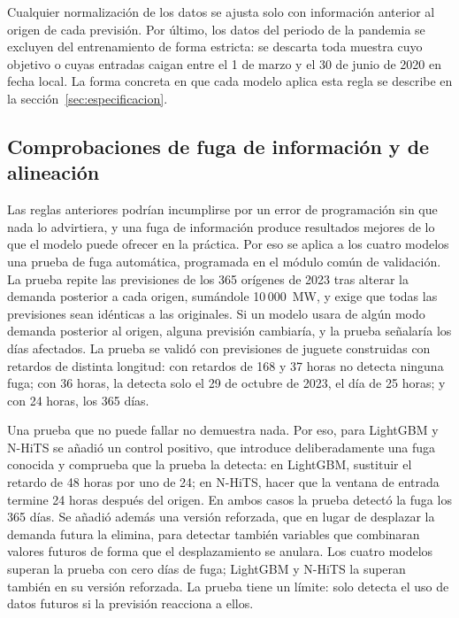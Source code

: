 Cualquier normalización de los datos se ajusta solo con información
anterior al origen de cada previsión. Por último, los datos del periodo de
la pandemia se excluyen del entrenamiento de forma estricta: se descarta
toda muestra cuyo objetivo o cuyas entradas caigan entre el 1 de marzo y el
30 de junio de 2020 en fecha local. La forma concreta en que cada modelo
aplica esta regla se describe en la sección~\ref{sec:especificacion}.

\subsection{Comprobaciones de fuga de información y de alineación}\label{sec:prot-fuga}

Las reglas anteriores podrían incumplirse por un error de programación sin
que nada lo advirtiera, y una fuga de información produce resultados mejores
de lo que el modelo puede ofrecer en la práctica. Por eso se aplica a los
cuatro modelos una prueba de fuga automática, programada en el módulo común
de validación. La prueba repite las previsiones de los 365 orígenes de 2023
tras alterar la demanda posterior a cada origen, sumándole 10\,000~MW, y
exige que todas las previsiones sean idénticas a las originales. Si un
modelo usara de algún modo demanda posterior al origen, alguna previsión
cambiaría, y la prueba señalaría los días afectados. La prueba se validó con
previsiones de juguete construidas con retardos de distinta longitud: con
retardos de 168 y 37 horas no detecta ninguna fuga; con 36 horas, la detecta
solo el 29 de octubre de 2023, el día de 25 horas; y con 24 horas, los 365
días.

Una prueba que no puede fallar no demuestra nada. Por eso, para LightGBM y
N-HiTS se añadió un control positivo, que introduce deliberadamente una fuga
conocida y comprueba que la prueba la detecta: en LightGBM, sustituir el
retardo de 48 horas por uno de 24; en N-HiTS, hacer que la ventana de entrada
termine 24 horas después del origen. En ambos casos la prueba detectó la fuga
los 365 días. Se añadió además una versión reforzada, que en lugar de
desplazar la demanda futura la elimina, para detectar también variables que
combinaran valores futuros de forma que el desplazamiento se anulara. Los
cuatro modelos superan la prueba con cero días de fuga; LightGBM y N-HiTS la
superan también en su versión reforzada. La prueba tiene un límite: solo
detecta el uso de datos futuros si la previsión reacciona a ellos.

